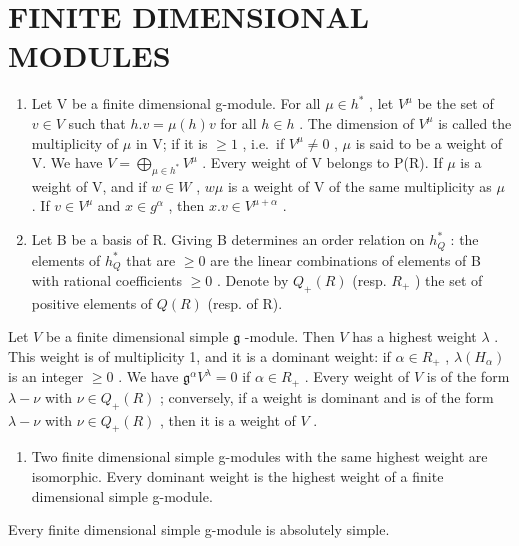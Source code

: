 \section*{FINITE DIMENSIONAL MODULES}

\begin{enumerate}
\def\labelenumi{\arabic{enumi})}
\setcounter{enumi}{18}
\item
  Let V be a finite dimensional g-module. For all \(\mu\in h^{*}\) , let \(V^{\mu}\) be the set of \(v\in V\) such that \(h.v=\mu(h)v\) for all \(h\in h\) . The dimension of \(V^{\mu}\) is called the multiplicity of \(\mu\) in V; if it is \(\geq1\) , i.e.~if \(V^{\mu}\neq0\) , \(\mu\) is said to be a weight of V. We have \(V=\bigoplus_{\mu\in h^{*}}V^{\mu}\) . Every weight of V belongs to P(R). If \(\mu\) is a weight of V, and if \(w\in W\) , \(w\mu\) is a weight of V of the same multiplicity as \(\mu\) . If \(v\in V^{\mu}\) and \(x\in g^{\alpha}\) , then \(x.v\in V^{\mu+\alpha}\) .
\item
  Let B be a basis of R. Giving B determines an order relation on \(h_{Q}^{*}\) : the elements of \(h_{Q}^{*}\) that are \(\geq 0\) are the linear combinations of elements of B with rational coefficients \(\geq 0\) . Denote by \(Q_{+}(R)\) (resp. \(R_{+}\) ) the set of positive elements of \(Q(R)\) (resp. of R).
\end{enumerate}

Let \(V\) be a finite dimensional simple \(\mathfrak{g}\) -module. Then \(V\) has a highest weight \(\lambda\) . This weight is of multiplicity 1, and it is a dominant weight: if \(\alpha \in R_{+}\) , \(\lambda(H_{\alpha})\) is an integer \(\geq 0\) . We have \(\mathfrak{g}^{\alpha}V^{\lambda} = 0\) if \(\alpha \in R_{+}\) . Every weight of \(V\) is of the form \(\lambda - \nu\) with \(\nu \in Q_{+}(R)\) ; conversely, if a weight is dominant and is of the form \(\lambda - \nu\) with \(\nu \in Q_{+}(R)\) , then it is a weight of \(V\) .

\begin{enumerate}
\def\labelenumi{\arabic{enumi})}
\setcounter{enumi}{20}
\tightlist
\item
  Two finite dimensional simple g-modules with the same highest weight are isomorphic. Every dominant weight is the highest weight of a finite dimensional simple g-module.
\end{enumerate}

Every finite dimensional simple g-module is absolutely simple.

